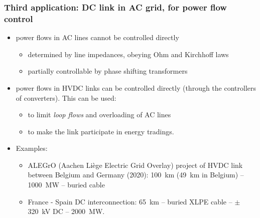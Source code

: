 \begin{frame}
\frametitle{Third application: DC link in AC grid, for power flow control}
\begin{itemize}
    \item power flows in AC lines cannot be controlled directly
    \begin{itemize}
        \item determined by line impedances, obeying Ohm and Kirchhoff laws
        \item partially controllable by phase shifting transformers
    \end{itemize}
    \item power flows in HVDC links can be controlled directly (through the controllers of converters). This can be used:
    \begin{itemize}
        \item to limit \emph{loop flows} and overloading of AC lines
        \item to make the link participate in energy tradings.
    \end{itemize}
    \item Examples:
    \begin{itemize}
        \item ALEGrO (Aachen Liège Electric Grid Overlay) project of HVDC link between Belgium and Germany (2020): \SI{100}{km} (\SI{49}{km} in Belgium) -- \SI{1000}{MW} -- buried cable
        \item France - Spain DC interconnection: \SI{65}{km} -- buried XLPE cable -- $\pm$ \SI{320}{kV} DC -- \SI{2000}{MW}.
    \end{itemize}
\end{itemize}
\end{frame}


